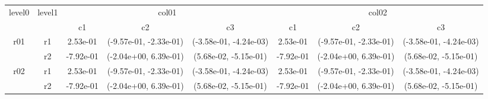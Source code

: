 \begin{tabular}{cccccccc}
\toprule
\multirow{2}{*}{level0} & \multirow{2}{*}{level1}&\multicolumn{3}{c}{col01}&\multicolumn{3}{c}{col02}\tabularnewline
\cmidrule(lr){3-5}
\cmidrule(lr){6-8}
&&c1&c2&c3&c1&c2&c3\tabularnewline
\midrule
\midrule
\multirow{2}{*}{r01}&r1&2.53e-01& (-9.57e-01, -2.33e-01)& (-3.58e-01, -4.24e-03)&2.53e-01& (-9.57e-01, -2.33e-01)& (-3.58e-01, -4.24e-03)\tabularnewline
&r2&-7.92e-01& (-2.04e+00, 6.39e-01)& (5.68e-02, -5.15e-01)&-7.92e-01& (-2.04e+00, 6.39e-01)& (5.68e-02, -5.15e-01)\tabularnewline
\midrule
\multirow{2}{*}{r02}&r1&2.53e-01& (-9.57e-01, -2.33e-01)& (-3.58e-01, -4.24e-03)&2.53e-01& (-9.57e-01, -2.33e-01)& (-3.58e-01, -4.24e-03)\tabularnewline
&r2&-7.92e-01& (-2.04e+00, 6.39e-01)& (5.68e-02, -5.15e-01)&-7.92e-01& (-2.04e+00, 6.39e-01)& (5.68e-02, -5.15e-01)\tabularnewline
\bottomrule
\end{tabular}
